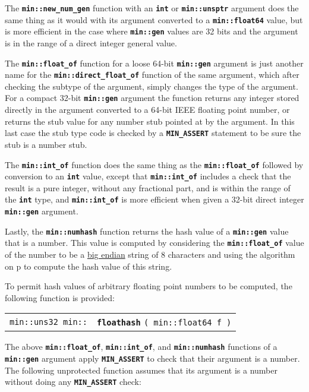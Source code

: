 \documentclass[12pt]{article}
\makeatletter
\newcommand{\TT}[1]{{\tt \bfseries #1}}
\newcommand{\ttindex}[1]{\index{#1@{\tt #1}}}
\newcommand{\pagref}[1]{p\pageref{#1}}
\newenvironment{indpar}[1][0.3in]%
	{\begin{list}{}%
		     {\setlength{\itemsep}{0in}%
		      \setlength{\topsep}{0in}%
		      \setlength{\parsep}{1ex}%
		      \setlength{\labelwidth}{#1}%
		      \setlength{\leftmargin}{#1}%
		      \addtolength{\leftmargin}{\labelsep}}%
	 \item}%
	{\end{list}}
\newcommand{\LABEL}[1]{\label{#1}}
\newcommand{\MINKEY}[1]%
	   {\TT{#1}\ttindex{min::#1}\ttindex{#1}}
\makeatother
\begin{document}
The \TT{min::new\_num\_gen} function with an \TT{int} or \TT{min::unsptr}
argument does the
same thing as it would with its argument converted to a \TT{min::float64}
value, but is more efficient in the case where \TT{min::gen} values
are 32 bits and the argument is in the range of a direct integer general
value.

The \TT{min::float\_of} function for a loose 64-bit \TT{min::gen}
argument is just another name for the \TT{min::direct\_float\_of} function
of the same argument, which after checking the subtype of the argument,
simply changes the type of the argument.
For a compact 32-bit \TT{min::gen} argument the
function returns any integer stored directly
in the argument converted to a 64-bit IEEE floating point number, or
returns the stub value for any number stub pointed at by the argument.
In this last case the stub type code is checked by a \TT{MIN\_ASSERT}
statement to be sure the stub is a number stub.

The \TT{min::int\_of} function does the same thing as the
\TT{min::float\_of} followed by conversion to an \TT{int} value,
except that \TT{min::int\_of} includes a check that the result
is a pure integer, without any fractional part, and is within the
range of the \TT{int} type, and
\TT{min::int\_of} is more efficient when given a 32-bit direct integer
\TT{min::gen} argument.

Lastly, the \TT{min::numhash} function
returns the hash value of a \TT{min::gen}
value that is a number.  This value is computed by considering
the \TT{min::float\_of} value of the number
to be a \underline{big endian} string of 8 characters and using the algorithm
on \pagref{HASH-ALGORITHM} to compute the hash value of this string.%
\label{NUMBER-HASH-ALGORITHM}

To permit hash values of arbitrary floating point numbers to be computed,
the following function is provided:

\begin{indpar}\begin{tabular}{r@{}l}
\verb|min::uns32 min::| & \MINKEY{floathash} \verb|( min::float64 f )|
\LABEL{MIN::FLOATHASH} \\
\end{tabular}\end{indpar}

The above \TT{min::float\_of}, \TT{min::int\_of}, and \TT{min::numhash}
functions of a \TT{min::gen} argument apply \TT{MIN\_ASSERT} to check
that their argument is a number.  The following unprotected function assumes
that its argument is a number without doing any \TT{MIN\_ASSERT} check:
\end{document}
